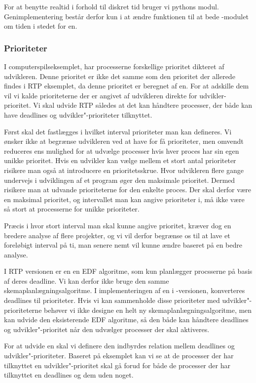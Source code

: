 For at benytte realtid i forhold til diskret tid bruger vi pythons  modul. Genimplementering består derfor kun i at ændre funktionen  til at bede -modulet om tiden i stedet for \sched en.

\subsubsection{Prioriteter}
I computerspilseksemplet, har processerne forskellige prioritet dikteret af udvikleren. 
Denne prioritet er ikke det samme som den prioritet der allerede findes i RTP eksemplet, da denne prioritet er beregnet af \sched en. For at adskille dem vil vi kalde prioriteterne der er angivet af udvikleren direkte for udvikler-prioritet. Vi skal udvide RTP således at det kan håndtere processer, der både kan have deadlines og udvikler"-prioriteter tilknyttet. 


Først skal det fastlægges i hvilket interval prioriteter  man kan defineres. Vi ønsker ikke at begrænse udvikleren ved at have for få prioriteter, men omvendt reduceres \sched ens  mulighed for at udvælge processer hvis hver proces har sin egen unikke prioritet. Hvis en udvikler kan vælge mellem et stort antal prioriteter risikere man også at introducere en prioritetsskrue. Hvor udvikleren flere gange undervejs i udviklingen af et program øger den maksimale prioritet. Dermed risikere man at udvande prioriteterne for den enkelte proces.  Der skal derfor være en maksimal prioritet, og intervallet man kan angive prioriteter i, må ikke være så stort at processerne for unikke prioriteter.

Præcis i hvor stort interval man skal kunne angive prioritet, kræver dog en bredere analyse af flere projekter, og vi vil derfor begrænse os til at lave et foreløbigt interval på ti, man senere nemt vil kunne ændre baseret på en bedre analyse.


I RTP versionen er \sched en en EDF algoritme, som kun planlægger procsserne på basis af deres deadline. Vi kan derfor ikke bruge den samme skemaplanlægningsalgoritme. I implementeringen af \sched en i -versionen, konverteres deadlines til prioriteter. Hvis vi kan sammenholde disse prioriteter med udvikler"-prioriteterne behøver vi  ikke designe en helt ny skemaplanlægningsalgoritme, men kan udvide den eksisterende EDF algoritme, så den både kan håndtere deadlines og udvikler"-prioritet når den udvælger processer der skal aktiveres.

For at udvide \sched en skal vi definere den indbyrdes relation mellem deadlines og udvikler"-prioriteter. Baseret på eksemplet kan vi se at de processer 
der har  tilknyttet en udvikler"-prioritet skal gå forud for både de processer der har tilknyttet en deadlines og dem uden noget. 

